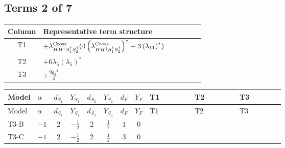 \documentclass[8pt]{article}
\begin{document}
\begin{landscape}
\subsection*{Terms 2 of 7}
\begin{center}
\begin{tabular}{@{}c >{\raggedright\arraybackslash}p{0.82\linewidth}@{}}
\toprule
Column & Representative term structure \\
\midrule
T1 & \(\displaystyle +{\lambda_{H H^\dagger S_1^\dagger S_2^\dagger}^{\rm Cross}} (4 \left({\lambda_{H H^\dagger S_1^\dagger S_2^\dagger}^{\rm Cross}}\right)^{*}+3 \left({\lambda_{11}}\right)^{*})\) \\
\midrule
T2 & \(\displaystyle +6 {\lambda_5} \left({\lambda_5}\right)^{*}\) \\
\midrule
T3 & \(\displaystyle +\frac{9 {g_2}^4}{4}\) \\
\midrule
\bottomrule
\end{tabular}
\end{center}
\smallskip
\tiny
\begin{longtable}{@{}llcccccc >{\raggedright\arraybackslash}p{0.21\linewidth} >{\raggedright\arraybackslash}p{0.21\linewidth} >{\raggedright\arraybackslash}p{0.21\linewidth}@{}}
\toprule
Model & $\alpha$ & $d_{S_1}$ & $Y_{S_1}$ & $d_{S_2}$ & $Y_{S_2}$ & $d_F$ & $Y_F$ & T1 & T2 & T3 \\
\midrule
\endfirsthead
\toprule
Model & $\alpha$ & $d_{S_1}$ & $Y_{S_1}$ & $d_{S_2}$ & $Y_{S_2}$ & $d_F$ & $Y_F$ & T1 & T2 & T3 \\
\midrule
\endhead
T3-B & $-1$ & $2$ & $-\frac{1}{2}$ & $2$ & $\frac{1}{2}$ & $1$ & $0$ & \scriptsize\adjustbox{max width=\linewidth}{$\begin{gathered} +{\lambda_{H H^\dagger S_1^\dagger S_2^\dagger}^{\rm Cross}} (4 \left({\lambda_{H H^\dagger S_1^\dagger S_2^\dagger}^{\rm Cross}}\right)^{*}+3 \left({\lambda_{11}}\right)^{*})\end{gathered}$} & \scriptsize\adjustbox{max width=\linewidth}{$\begin{gathered} +6 {\lambda_5} \left({\lambda_5}\right)^{*}\end{gathered}$} & \scriptsize\adjustbox{max width=\linewidth}{$\begin{gathered} +\frac{9 {g_2}^4}{4}\end{gathered}$} \\
\midrule
T3-C & $-1$ & $2$ & $-\frac{1}{2}$ & $2$ & $\frac{1}{2}$ & $3$ & $0$ & \scriptsize\adjustbox{max width=\linewidth}{$\begin{gathered} +{\lambda_{H H^\dagger S_1^\dagger S_2^\dagger}^{\rm Cross}} (4 \left({\lambda_{H H^\dagger S_1^\dagger S_2^\dagger}^{\rm Cross}}\right)^{*}+3 \left({\lambda_{11}}\right)^{*})\end{gathered}$} & \scriptsize\adjustbox{max width=\linewidth}{$\begin{gathered} +6 {\lambda_5} \left({\lambda_5}\right)^{*}\end{gathered}$} & \scriptsize\adjustbox{max width=\linewidth}{$\begin{gathered} +\frac{9 {g_2}^4}{4}\end{gathered}$} \\

\end{longtable}
\end{landscape}
\end{document}

